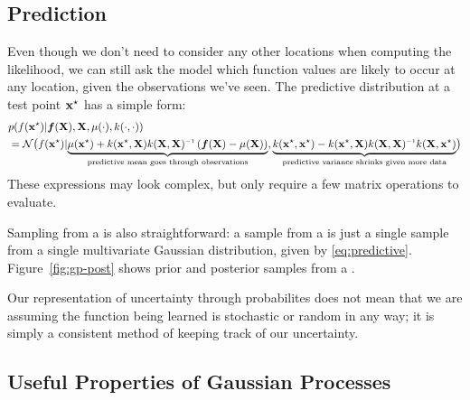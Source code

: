 \subsection{Prediction}
Even though we don't need to consider any other locations when computing the likelihood, we can still ask the model which function values are likely to occur at any location, given the observations we've seen.
The predictive distribution at a test point ${{\bf{x}}^\star}$ has a simple form:
%
\begin{align}
& p( f(\testpoint) | \funcval, \vX, \mu(\cdot), k(\cdot, \cdot)) \nonumber\\
& = \mathcal{N} \big( f(\testpoint) | \underwrite{\mu(\testpoint) + k(\testpoint, \vX) k(\vX, \vX)\inv \left( \funcval - \mu(\vX) \right) }{predictive mean goes through observations}, 
\underwrite{k(\testpoint, \testpoint) - k(\testpoint, \vX) k(\vX, \vX)\inv k(\vX, \testpoint)}{predictive variance shrinks given more data}
 \big)
\label{eq:predictive}
\end{align}
%
These expressions may look complex, but only require a few matrix operations to evaluate.


Sampling from a \gp{} is also straightforward: a sample from a \gp{} is just a single sample from a single multivariate Gaussian distribution, given by \cref{eq:predictive}.
Figure~\ref{fig:gp-post} shows prior and posterior samples from a \gp{}.

Our representation of uncertainty through probabilites does not mean that we are assuming the function being learned is stochastic or random in any way; it is simply a consistent method of keeping track of our uncertainty.





\subsection{Useful Properties of Gaussian Processes}


